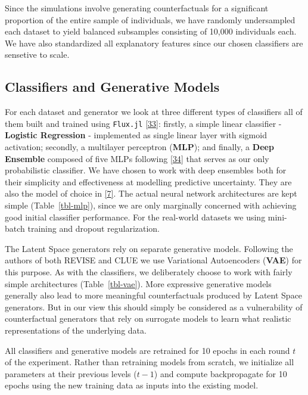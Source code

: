 \documentclass[
  conference]{IEEEtran}
\begin{document}
Since the simulations involve generating counterfactuals for a
significant proportion of the entire sample of individuals, we have
randomly undersampled each dataset to yield balanced subsamples
consisting of 10,000 individuals each. We have also standardized all
explanatory features since our chosen classifiers are sensetive to
scale.

\hypertarget{sec-empirical-classifiers}{%
\subsection{Classifiers and Generative
Models}\label{sec-empirical-classifiers}}

For each dataset and generator we look at three different types of
classifiers all of them built and trained using \texttt{Flux.jl}
\protect\hyperlink{ref-innes2018fashionable}{{[}33{]}}: firstly, a
simple linear classifier - \textbf{Logistic Regression} - implemented as
single linear layer with sigmoid activation; secondly, a multilayer
perceptron (\textbf{MLP}); and finally, a \textbf{Deep Ensemble}
composed of five MLPs following
\protect\hyperlink{ref-lakshminarayanan2016simple}{{[}34{]}} that serves
as our only probabilistic classifier. We have chosen to work with deep
ensembles both for their simplicity and effectiveness at modelling
predictive uncertainty. They are also the model of choice in
\protect\hyperlink{ref-schut2021generating}{{[}7{]}}. The actual neural
network architectures are kept simple (Table~\ref{tbl-mlp}), since we
are only marginally concerned with achieving good initial classifier
performance. For the real-world datasets we using mini-batch training
and dropout regularization.

The Latent Space generators rely on separate generative models.
Following the authors of both REVISE and CLUE we use Variational
Autoencoders (\textbf{VAE}) for this purpose. As with the classifiers,
we deliberately choose to work with fairly simple architectures
(Table~\ref{tbl-vae}). More expressive generative models generally also
lead to more meaningful counterfactuals produced by Latent Space
generators. But in our view this should simply be considered as a
vulnerability of counterfactual generators that rely on surrogate models
to learn what realistic representations of the underlying data.

All classifiers and generative models are retrained for 10 epochs in
each round \(t\) of the experiment. Rather than retraining models from
scratch, we initialize all parameters at their previous levels (\(t-1\))
and compute backpropagate for 10 epochs using the new training data as
inputs into the existing model.
\end{document}
